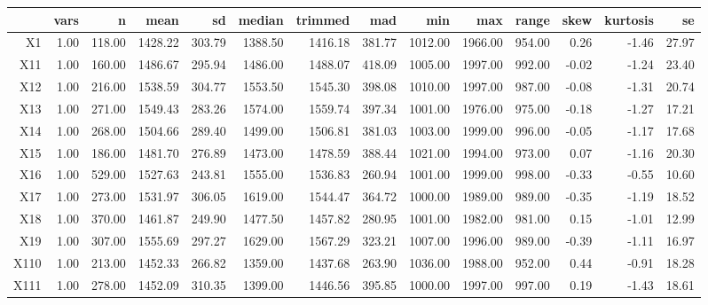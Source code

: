 \begin{tabular}{rrrrrrrrrrrrrr}
  \hline
 & vars & n & mean & sd & median & trimmed & mad & min & max & range & skew & kurtosis & se \\ 
  \hline
X1 & 1.00 & 118.00 & 1428.22 & 303.79 & 1388.50 & 1416.18 & 381.77 & 1012.00 & 1966.00 & 954.00 & 0.26 & -1.46 & 27.97 \\ 
  X11 & 1.00 & 160.00 & 1486.67 & 295.94 & 1486.00 & 1488.07 & 418.09 & 1005.00 & 1997.00 & 992.00 & -0.02 & -1.24 & 23.40 \\ 
  X12 & 1.00 & 216.00 & 1538.59 & 304.77 & 1553.50 & 1545.30 & 398.08 & 1010.00 & 1997.00 & 987.00 & -0.08 & -1.31 & 20.74 \\ 
  X13 & 1.00 & 271.00 & 1549.43 & 283.26 & 1574.00 & 1559.74 & 397.34 & 1001.00 & 1976.00 & 975.00 & -0.18 & -1.27 & 17.21 \\ 
  X14 & 1.00 & 268.00 & 1504.66 & 289.40 & 1499.00 & 1506.81 & 381.03 & 1003.00 & 1999.00 & 996.00 & -0.05 & -1.17 & 17.68 \\ 
  X15 & 1.00 & 186.00 & 1481.70 & 276.89 & 1473.00 & 1478.59 & 388.44 & 1021.00 & 1994.00 & 973.00 & 0.07 & -1.16 & 20.30 \\ 
  X16 & 1.00 & 529.00 & 1527.63 & 243.81 & 1555.00 & 1536.83 & 260.94 & 1001.00 & 1999.00 & 998.00 & -0.33 & -0.55 & 10.60 \\ 
  X17 & 1.00 & 273.00 & 1531.97 & 306.05 & 1619.00 & 1544.47 & 364.72 & 1000.00 & 1989.00 & 989.00 & -0.35 & -1.19 & 18.52 \\ 
  X18 & 1.00 & 370.00 & 1461.87 & 249.90 & 1477.50 & 1457.82 & 280.95 & 1001.00 & 1982.00 & 981.00 & 0.15 & -1.01 & 12.99 \\ 
  X19 & 1.00 & 307.00 & 1555.69 & 297.27 & 1629.00 & 1567.29 & 323.21 & 1007.00 & 1996.00 & 989.00 & -0.39 & -1.11 & 16.97 \\ 
  X110 & 1.00 & 213.00 & 1452.33 & 266.82 & 1359.00 & 1437.68 & 263.90 & 1036.00 & 1988.00 & 952.00 & 0.44 & -0.91 & 18.28 \\ 
  X111 & 1.00 & 278.00 & 1452.09 & 310.35 & 1399.00 & 1446.56 & 395.85 & 1000.00 & 1997.00 & 997.00 & 0.19 & -1.43 & 18.61 \\ 
   \hline
\end{tabular}